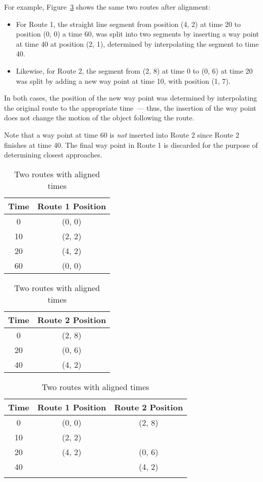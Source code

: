 \documentclass[times,12pt]{article}
\begin{document}
For example, Figure~\ref{fig:aligned-routes} shows the same two routes after alignment:
\begin{itemize}
	\item For Route 1, the straight line segment from position (4, 2) at time 20 to position (0, 0) a time 60, was split into two segments by inserting a way point at time 40 at position (2, 1), determined by interpolating the segment to time 40.
	
	\item Likewise, for Route 2, the segment from (2, 8) at time 0 to (0, 6) at time 20 was split by adding a new way point at time 10, with position (1, 7).
\end{itemize}

In both cases, the position of the new way point was determined by interpolating the original route to the appropriate time~--- thus, the insertion of the way point does not change the motion of the object following the route. 

Note that a way point at time 60 is \emph{not} inserted into Route 2 since Route 2 finishes at time 40. The final way point in Route 1 is discarded for the purpose of determining closest approaches.

\begin{table}[tbp]
	\centering
	\begin{tabular}[t]{|c|c|} \hline
		Time & Route 1 Position \\ \hline
		0 & (0, 0) \\ \hline
		10 & (2, 2) \\ \hline
		20 & (4, 2) \\ \hline
		60 & (0, 0) \\ \hline
	\end{tabular}
\qquad
\begin{tabular}[t]{|c|c|} \hline
	Time & Route 2 Position \\ \hline
	0 & (2, 8) \\ \hline
	20 & (0, 6) \\ \hline
	40 & (4, 2) \\ \hline
\end{tabular}
	\caption{Two routes with unaligned times}
	\label{fig:unaligned-routes}

\vspace{3ex}

\begin{tabular}{|c|c|c|} \hline
	Time & Route 1 Position & Route 2 Position \\ \hline
	0 & (0, 0) & (2, 8) \\ \hline
	10 & (2, 2) & \textbf{\color{blue}{(1, 7)}} \\ \hline
	20 & (4, 2) & (0, 6) \\ \hline
	40 & \textbf{\color{blue}{(2, 1)}} & (4, 2) \\ \hline
	\color{gray}{60} & \color{gray}{(0, 0)} & \\ \hline
\end{tabular}
\caption{Two routes with aligned times}
\label{fig:aligned-routes}
\end{table}
\end{document}
